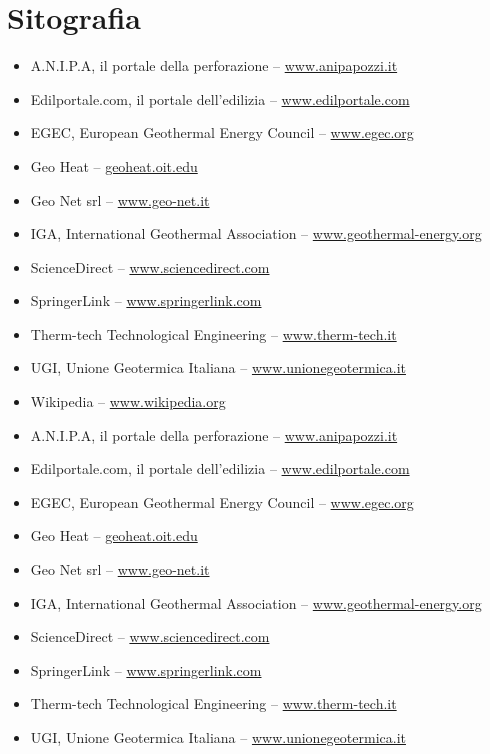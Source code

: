 \chapter*{Sitografia}



\begin{itemize}
	\item A.N.I.P.A, il portale della perforazione	-- \url{www.anipapozzi.it}
	\item Edilportale.com, il portale dell'edilizia -- \url{www.edilportale.com}
	\item EGEC, European Geothermal Energy Council -- \url{www.egec.org}
	\item Geo Heat -- \url{geoheat.oit.edu}
	\item Geo Net srl -- \url{www.geo-net.it}
	\item IGA, International Geothermal Association -- \url{www.geothermal-energy.org}
	\item ScienceDirect -- \url{www.sciencedirect.com}
	\item SpringerLink -- \url{www.springerlink.com}
	\item Therm-tech Technological Engineering -- \url{www.therm-tech.it}
	\item UGI, Unione Geotermica Italiana -- \url{www.unionegeotermica.it}
	\item Wikipedia -- \url{www.wikipedia.org}
		\item A.N.I.P.A, il portale della perforazione	-- \url{www.anipapozzi.it}
	\item Edilportale.com, il portale dell'edilizia -- \url{www.edilportale.com}
	\item EGEC, European Geothermal Energy Council -- \url{www.egec.org}
	\item Geo Heat -- \url{geoheat.oit.edu}
	\item Geo Net srl -- \url{www.geo-net.it}
	\item IGA, International Geothermal Association -- \url{www.geothermal-energy.org}
	\item ScienceDirect -- \url{www.sciencedirect.com}
	\item SpringerLink -- \url{www.springerlink.com}
	\item Therm-tech Technological Engineering -- \url{www.therm-tech.it}
	\item UGI, Unione Geotermica Italiana -- \url{www.unionegeotermica.it}

\end{itemize}
